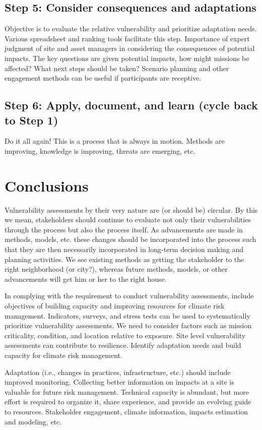 \documentclass[10pt]{amsart}
\begin{document}
\subsection{Step 5: Consider consequences and adaptations}
Objective is to evaluate the relative vulnerability and prioritize adaptation needs.
Various spreadsheet and ranking tools facilitate this step.
Importance of expert judgment of site and asset managers in considering the consequences of potential impacts.
The key questions are given potential impacts, how might missions be affected?
What next steps should be taken?
Scenario planning and other engagement methods can be useful if participants are receptive.

\subsection{Step 6: Apply, document, and learn (cycle back to Step 1)}
Do it all again!
This is a process that is always in motion.
Methods are improving, knowledge is improving, threats are emerging, etc.



\section{Conclusions}
Vulnerability assessments by their very nature are (or should be) circular.
By this we mean, stakeholders should continue to evaluate not only their vulnerabilities through the process but also the process itself.
As advancements are made in methods, models, etc. these changes should be incorporated into the process such that they are then necessarily incorporated in long-term decision making and planning activities. 
We see existing methods as getting the stakeholder to the right neighborhood (or city?), whereas future methods, models, or other advancements will get him or her to the right house. 

In complying with the requirement to conduct vulnerability assessments, include objectives of building capacity and improving resources for climate risk management.
Indicators, surveys, and stress tests can be used to systematically prioritize vulnerability assessments.
We need to consider factors such as mission criticality, condition, and location relative to exposure.
Site level vulnerability assessments can contribute to resilience.
Identify adaptation needs and build capacity for climate risk management.

Adaptation (i.e., changes in practices, infrastructure, etc.) should include improved monitoring.
Collecting better information on impacts at a site is valuable for future risk management.
Technical capacity is abundant, but more effort is required to organize it, share experience, and provide an evolving guide to resources.
Stakeholder engagement, climate information, impacts estimation and modeling, etc.



\newpage
\printbibliography
\end{document}
